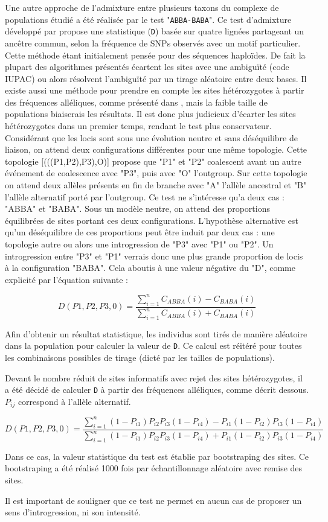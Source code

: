 Une autre approche de l'admixture entre plusieurs taxons du complexe de populations étudié a été réalisée par le test "\verb|ABBA-BABA|".
 Ce test d'admixture développé par \citet{Durand2011} propose une statistique (\verb|D|) basée sur quatre lignées partageant un ancêtre commun, selon la fréquence de SNPs observés avec un motif particulier.
 Cette méthode étant initialement pensée pour des séquences haploïdes.
 De fait la plupart des algorithmes présentés écartent les sites avec une ambiguïté (code IUPAC) ou alors résolvent l’ambiguïté par un tirage aléatoire entre deux bases.
 Il existe aussi une méthode pour prendre en compte les sites hétérozygotes à partir des fréquences alléliques, comme présenté dans \citet{Durand2011}, mais la faible taille de populations biaiserais les résultats.
 Il est donc plus judicieux d'écarter les sites hétérozygotes dans un premier temps, rendant le test plus conservateur.
 Considérant que les locis sont sous une évolution neutre et sans déséquilibre de liaison, on attend deux configurations différentes pour une même topologie.
 Cette topologie [(((P1,P2),P3),O)] propose que "P1" et "P2" coalescent avant un autre événement de coalescence avec "P3", puis avec "O" l'outgroup.
 Sur cette topologie on attend deux allèles présents en fin de branche avec "A" l'allèle ancestral et "B" l'allèle alternatif porté par l'outgroup.
 Ce test ne s'intéresse qu'a deux cas : "ABBA" et "BABA".
 Sous un modèle neutre, on attend des proportions équilibrées de sites portant ces deux configurations.
 L'hypothèse alternative est qu'un déséquilibre de ces proportions peut être induit par deux cas : une topologie autre ou alors une introgression de "P3" avec "P1" ou "P2".
 Un introgression entre "P3" et "P1" verrais donc une plus grande proportion de locis à la configuration "BABA".
 Cela aboutis à une valeur négative du "D", comme explicité par l'équation suivante :

\[D(P1,P2,P3,0)=\frac{\sum_{i=1}^{n} C_{ABBA}(i)-C_{BABA}(i)}{\sum_{i=1}^{n} C_{ABBA}(i)+C_{BABA}(i)}\]

Afin d'obtenir un résultat statistique, les individus sont tirés de manière aléatoire dans la population pour calculer la valeur de \verb|D|.
 Ce calcul est réitéré pour toutes les combinaisons possibles de tirage (dicté par les tailles de populations). 

Devant le nombre réduit de sites informatifs avec rejet des sites hétérozygotes, il a été décidé de calculer \verb|D| à partir des fréquences alléliques, comme décrit dessous.
 \textit{$P_{ij}$} correspond à l'allèle alternatif. 
 

\[D(P1,P2,P3,0)=\frac{\sum_{i=1}^{n} (1-P_{i1})P_{i2}P_{i3}(1-P_{i4})-P_{i1}(1-P_{i2})P_{i3}(1-P_{i4})}{\sum_{i=1}^{n} (1-P_{i1})P_{i2}P_{i3}(1-P_{i4})+P_{i1}(1-P_{i2})P_{i3}(1-P_{i4})}\]

Dans ce cas, la valeur statistique du test est établie par bootstraping des sites. Ce bootstraping a été réalisé 1000 fois par échantillonnage aléatoire avec remise des sites.


Il est important de souligner que ce test ne permet en aucun cas de proposer un sens d'introgression, ni son intensité.


